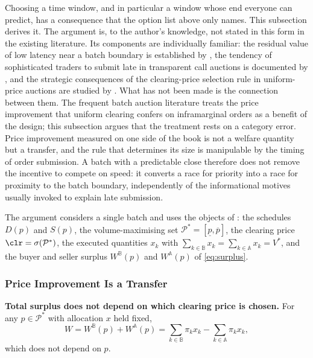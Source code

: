 Choosing a time window, and in particular a window whose end everyone can
predict, has a consequence that the option list above only names. This
subsection derives it. The argument is, to the author's knowledge, not
stated in this form in the existing literature. Its components are
individually familiar: the residual value of low latency near a batch
boundary is established by \citet{schlegel2023transaction}, the tendency of
sophisticated traders to submit late in transparent call auctions is
documented by \citet{daures2026click}, and the strategic consequences of
the clearing-price selection rule in uniform-price auctions are studied by
\citet{burkett2020uniform}. What has not been made is the connection
between them. The frequent batch auction literature treats the price
improvement that uniform clearing confers on inframarginal orders as a
benefit of the design; this subsection argues that the treatment rests on a
category error. Price improvement measured on one side of the book is not
a welfare quantity but a transfer, and the rule that determines its size
is manipulable by the timing of order submission. A batch with a
predictable close therefore does not remove the incentive to compete on
speed: it converts a race for priority into a race for proximity to the
batch boundary, independently of the informational motives usually
invoked to explain late submission.

The argument considers a single batch and uses the objects of
: the schedules $D(p)$ and $S(p)$, the
volume-maximising set $\mathcal{P}^{*} = [\underline{p}, \overline{p}]$,
the clearing price $\clr = \sigma(\mathcal{P}^{*})$, the executed
quantities $x_k$ with $\sum_{k \in \mathbb{B}} x_k = \sum_{k \in \mathbb{A}}
x_k = V^{*}$, and the buyer and seller surplus $W^{\mathbb{B}}(p)$ and
$W^{\mathbb{A}}(p)$ of \eqref{eq:surplus}.

\subsubsection{Price Improvement Is a Transfer}

\textbf{Total surplus does not depend on which clearing price is chosen.}
For any $p \in \mathcal{P}^{*}$ with allocation $x$ held fixed,
\begin{equation}
\label{lem:invariance}
  W = W^{\mathbb{B}}(p) + W^{\mathbb{A}}(p)
    = \sum_{k \in \mathbb{B}} \pi_k x_k
      - \sum_{k \in \mathbb{A}} \pi_k x_k ,
\end{equation}
which does not depend on $p$.

